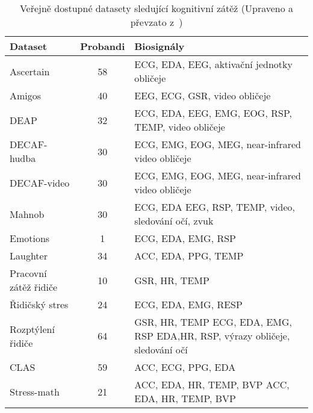 \begin{table}[h]
    \centering
    \caption{Veřejně dostupné datasety sledující kognitivní zátěž (Upraveno a
        převzato z~\cite{Gjoreski2020})}
    \label{tab:cl_datasets}
    \scriptsize
    \begin{tabular}{lcp{9cm}}
        \toprule
        \textbf{Dataset}      & \textbf{Probandi} & \textbf{Biosignály}                                                          \\ \midrule
        Ascertain             & 58                & ECG, EDA, EEG, aktivační jednotky obličeje                                   \\
        Amigos                & 40                & EEG, ECG, GSR, video obličeje                                                \\
        DEAP                  & 32                & ECG, EDA, EEG, EMG, EOG, RSP, TEMP, video obličeje                           \\
        DECAF-hudba           & 30                & ECG, EMG, EOG, MEG, near-infrared video obličeje                             \\
        DECAF-video           & 30                & ECG, EMG, EOG, MEG, near-infrared video obličeje                             \\
        Mahnob                & 30                & ECG, EDA EEG, RSP, TEMP, video, sledování očí, zvuk                          \\
        Emotions              & 1                 & ECG, EDA, EMG, RSP                                                           \\
        Laughter              & 34                & ACC, EDA, PPG, TEMP                                                          \\ \midrule
        Pracovní zátěž řidiče & 10                & GSR, HR, TEMP                                                                \\
        Řidičský stres        & 24                & ECG, EDA, EMG, RESP                                                          \\
        Rozptýlení řidiče     & 64                & GSR, HR, TEMP ECG, EDA, EMG, RSP EDA,HR, RSP, výrazy obličeje, sledování očí \\ \midrule
        CLAS                  & 59                & ACC, ECG, PPG, EDA                                                           \\
        Stress-math           & 21                & ACC, EDA, HR, TEMP, BVP ACC, EDA, HR, TEMP, BVP                              \\

\end{tabular}
\end{table}

